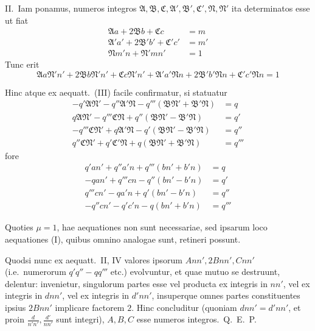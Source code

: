 \documentclass[12pt,a4paper]{article}
\theoremstyle{plain}
\theoremstyle{definition}
\theoremstyle{remark}
\begin{document}
II.\ Iam ponamus, numeros integros $\mathfrak{A}, \mathfrak{B}, \mathfrak{C}, \mathfrak{A}', \mathfrak{B}', \mathfrak{C}', \mathfrak{N}, \mathfrak{N}'$ ita determinatos esse ut fiat
\begin{align*}
\mathfrak{A}a + 2\mathfrak{B}b + \mathfrak{C}c &= m \\
\mathfrak{A}'a' + 2\mathfrak{B}'b' + \mathfrak{C}'c' &= m' \\
\mathfrak{N}m'n + \mathfrak{N}'mn' &= 1
\end{align*}
Tunc erit
\[
\mathfrak{A}a\mathfrak{N}'n' + 2\mathfrak{B}b\mathfrak{N}'n' + \mathfrak{C}c\mathfrak{N}'n' + \mathfrak{A}'a'\mathfrak{N}n + 2\mathfrak{B}'b'\mathfrak{N}n + \mathfrak{C}'c'\mathfrak{N}n = 1
\]

Hinc atque ex aequatt.\ (III) facile confirmatur, si statuatur
\begin{align*}
-q'\mathfrak{A}\mathfrak{N}' - q''\mathfrak{A}'\mathfrak{N} - q'''(\mathfrak{B}\mathfrak{N}' + \mathfrak{B}'\mathfrak{N}) &= q \\
q\mathfrak{A}\mathfrak{N}' - q'''\mathfrak{C}\mathfrak{N} + q''(\mathfrak{B}\mathfrak{N}' - \mathfrak{B}'\mathfrak{N}) &= q' \\
-q'''\mathfrak{C}\mathfrak{N}' + q\mathfrak{A}'\mathfrak{N} - q'(\mathfrak{B}\mathfrak{N}' - \mathfrak{B}'\mathfrak{N}) &= q'' \\
q''\mathfrak{C}\mathfrak{N}' + q'\mathfrak{C}'\mathfrak{N} + q(\mathfrak{B}\mathfrak{N}' + \mathfrak{B}'\mathfrak{N}) &= q'''
\end{align*}
fore
\begin{align*}
q'an' + q''a'n + q'''(bn' + b'n) &= q \\
-qan' + q'''cn - q''(bn' - b'n) &= q' \\
q'''cn' - qa'n + q'(bn' - b'n) &= q'' \\
-q''cn' - q'c'n - q(bn' + b'n) &= q'''\tag{IV}
\end{align*}

Quoties $\mu = 1$, hae aequationes non sunt necessariae, sed ipsarum loco aequationes (I), quibus omnino analogae sunt, retineri possunt.

Quodsi nunc ex aequatt.\ II, IV valores ipsorum $Ann', 2Bnn', Cnn'$ (i.e.\ numerorum $q'q'' - qq'''$ etc.) evolvuntur, et quae mutuo se destruunt, delentur: invenietur, singulorum partes esse vel producta ex integris in $nn'$, vel ex integris in $dnn'$, vel ex integris in $d'nn'$, insuperque omnes partes constituentes ipsius $2Bnn'$ implicare factorem $2$. Hinc concluditur (quoniam $dnn' = d'nn'$, et proin $\tfrac{d}{n'n'}, \tfrac{d'}{nn'}$ sunt integri), $A, B, C$ esse numeros integros.\ Q.\ E.\ P.
\end{document}
